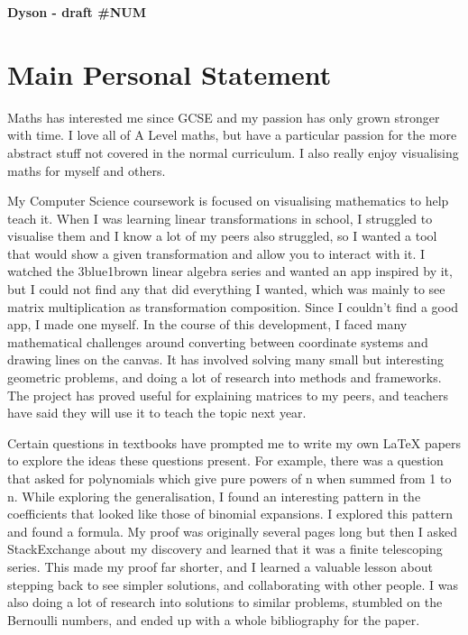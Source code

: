 \documentclass[a4paper, 12pt]{article}
\newenvironment{personalstatement}{\directlua{startPersonalStatement()}}{\directlua{stopPersonalStatement()}}
\begin{document}
\begin{center}
	\vspace*{3mm}
	\huge{\textbf{Dyson - draft \#NUM}}
\end{center}

\setlength{\parskip}{7.5ex}
\setlength{\parindent}{0em}

\vspace*{-12ex} %
\section*{Main Personal Statement}
\vspace*{-6ex}

\begin{personalstatement}
Maths has interested me since GCSE and my passion has only grown stronger with time. I love all of A Level maths, but have a particular passion for the more abstract stuff not covered in the normal curriculum. I also really enjoy visualising maths for myself and others.

My Computer Science coursework is focused on visualising mathematics to help teach it. When I was learning linear transformations in school, I struggled to visualise them and I know a lot of my peers also struggled, so I wanted a tool that would show a given transformation and allow you to interact with it. I watched the 3blue1brown linear algebra series and wanted an app inspired by it, but I could not find any that did everything I wanted, which was mainly to see matrix multiplication as transformation composition. Since I couldn't find a good app, I made one myself. In the course of this development, I faced many mathematical challenges around converting between coordinate systems and drawing lines on the canvas. It has involved solving many small but interesting geometric problems, and doing a lot of research into methods and frameworks. The project has proved useful for explaining matrices to my peers, and teachers have said they will use it to teach the topic next year.

Certain questions in textbooks have prompted me to write my own LaTeX papers to explore the ideas these questions present. For example, there was a question that asked for polynomials which give pure powers of n when summed from 1 to n. While exploring the generalisation, I found an interesting pattern in the coefficients that looked like those of binomial expansions. I explored this pattern and found a formula. My proof was originally several pages long but then I asked StackExchange about my discovery and learned that it was a finite telescoping series. This made my proof far shorter, and I learned a valuable lesson about stepping back to see simpler solutions, and collaborating with other people. I was also doing a lot of research into solutions to similar problems, stumbled on the Bernoulli numbers, and ended up with a whole bibliography for the paper.


\end{personalstatement}
\end{document}
